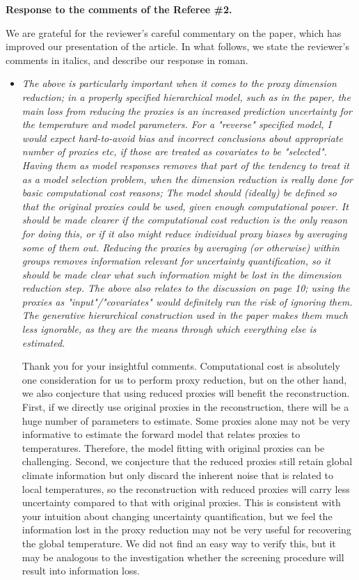 \documentclass[11pt]{article}
\begin{document}
\begin{center}
  {\Large \textbf{Response to the comments of the Referee \#2.}}
\end{center}

We are grateful for the reviewer's careful commentary on the paper, which has improved
our presentation of the article. In what follows, we state the reviewer's
comments in italics, and describe our response in roman.

\begin{itemize}
\item \textit{The above is particularly important when it comes to the proxy
  dimension reduction; in a properly specified hierarchical model,
  such as in the paper, the main loss from reducing the proxies is an
  increased prediction uncertainty for the temperature and model
  parameters.  For a "reverse" specified model, I would expect
  hard-to-avoid bias and incorrect conclusions about appropriate
  number of proxies etc, if those are treated as covariates to be
  "selected". Having them as model responses removes that part of the
  tendency to treat it as a model selection problem, when the
  dimension reduction is really done for basic computational cost
  reasons; The model should (ideally) be defined so that the original
  proxies could be used, given enough computational power.  It should
  be made clearer if the computational cost reduction is the only
  reason for doing this, or if it also might reduce individual proxy
  biases by averaging some of them out.  Reducing the proxies by
  averaging (or otherwise) within groups removes information relevant
  for uncertainty quantification, so it should be made clear what such
  information might be lost in the dimension reduction step. The above also relates to the discussion on page 10; using the
  proxies as "input"/"covariates" would definitely run the risk of
  ignoring them. The generative hierarchical construction used in the
  paper makes them much less ignorable, as they are the means through
  which everything else is estimated.}

Thank you for your insightful comments. Computational cost is absolutely one consideration for us to perform proxy reduction, but on the other hand, we also conjecture that using reduced proxies will benefit the reconstruction. First, if we directly use original proxies in the reconstruction, there will be a huge number of parameters to estimate. Some proxies alone may not be very  informative to estimate the forward model that relates proxies to temperatures. Therefore, the model fitting with original proxies can be challenging. Second, we conjecture that the reduced proxies still retain global climate information but only discard the inherent noise that is related to local temperatures, so the reconstruction with reduced proxies will carry less uncertainty compared to that with original proxies. This is consistent with your intuition about changing uncertainty quantification, but we feel the information lost in the proxy reduction may not be very useful for recovering the global temperature. We did not find an easy way to verify this, but it may be analogous to the investigation whether the screening procedure will result into information loss.    



\end{itemize}
\end{document}
